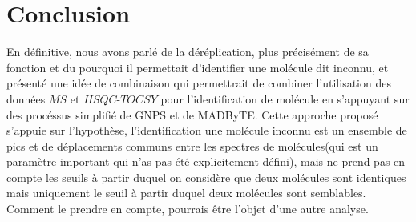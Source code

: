 \documentclass[12pt, french, latin.medieval, a4paper]{report}
\begin{document}
        
        \section{Conclusion}
            En définitive, nous avons parlé de la déréplication, plus précisément de sa fonction et du pourquoi il permettait d'identifier une molécule dit inconnu, et présenté une idée de combinaison qui permettrait de combiner l'utilisation des données $MS$ et $HSQC$-$TOCSY$ pour l'identification de molécule en s'appuyant sur des procéssus simplifié de GNPS et de MADByTE. Cette approche proposé s'appuie sur l'hypothèse, l'identification une molécule inconnu est un ensemble de pics et de déplacements communs entre les spectres de molécules(qui est un paramètre important qui n'as pas été explicitement défini), mais ne prend pas en compte les seuils à partir duquel on considère que deux molécules sont identiques mais uniquement le seuil à partir duquel deux molécules sont semblables. Comment le prendre en compte, pourrais être l'objet d'une autre analyse.


    
    
\end{document}
